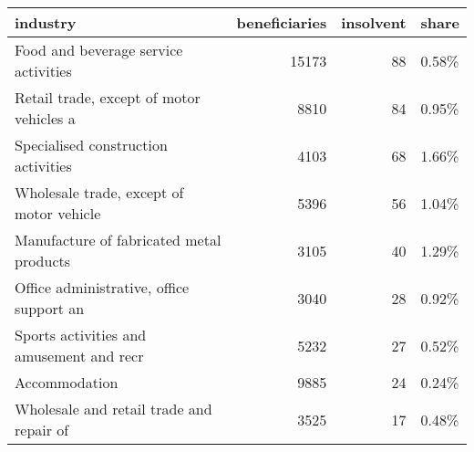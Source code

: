 \begin{tabular}{lrrl}
\toprule
                                industry &  beneficiaries &  insolvent & share \\
\midrule
    Food and beverage service activities &          15173 &         88 & 0.58\% \\
Retail trade, except of motor vehicles a &           8810 &         84 & 0.95\% \\
     Specialised construction activities &           4103 &         68 & 1.66\% \\
Wholesale trade, except of motor vehicle &           5396 &         56 & 1.04\% \\
Manufacture of fabricated metal products &           3105 &         40 & 1.29\% \\
Office administrative, office support an &           3040 &         28 & 0.92\% \\
Sports activities and amusement and recr &           5232 &         27 & 0.52\% \\
                           Accommodation &           9885 &         24 & 0.24\% \\
Wholesale and retail trade and repair of &           3525 &         17 & 0.48\% \\
\bottomrule
\end{tabular}

